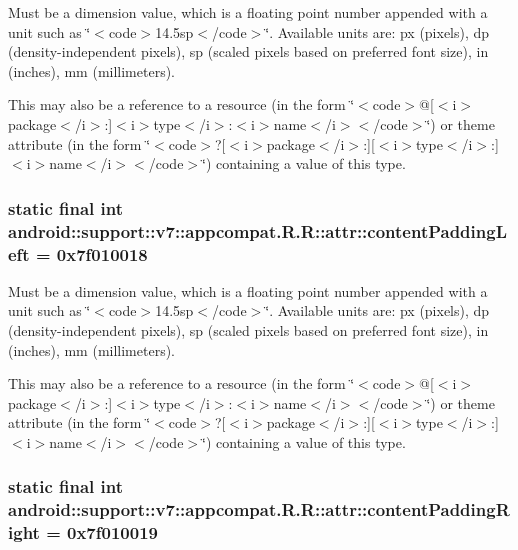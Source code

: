 Must be a dimension value, which is a floating point number appended with a unit such as \char`\"{}$<$code$>$14.5sp$<$/code$>$\char`\"{}. Available units are: px (pixels), dp (density-independent pixels), sp (scaled pixels based on preferred font size), in (inches), mm (millimeters). 

This may also be a reference to a resource (in the form \char`\"{}$<$code$>$@\mbox{[}$<$i$>$package$<$/i$>$:\mbox{]}$<$i$>$type$<$/i$>$:$<$i$>$name$<$/i$>$$<$/code$>$\char`\"{}) or theme attribute (in the form \char`\"{}$<$code$>$?\mbox{[}$<$i$>$package$<$/i$>$:\mbox{]}\mbox{[}$<$i$>$type$<$/i$>$:\mbox{]}$<$i$>$name$<$/i$>$$<$/code$>$\char`\"{}) containing a value of this type. \hypertarget{classandroid_1_1support_1_1v7_1_1appcompat_1_1_r_1_1attr_0a95570e618859c205ffbea644dd70d1}{
\subsubsection[{contentPaddingLeft}]{\setlength{\rightskip}{0pt plus 5cm}static final int android::support::v7::appcompat.R.R::attr::contentPaddingLeft = 0x7f010018}}
\label{classandroid_1_1support_1_1v7_1_1appcompat_1_1_r_1_1attr_0a95570e618859c205ffbea644dd70d1}


Must be a dimension value, which is a floating point number appended with a unit such as \char`\"{}$<$code$>$14.5sp$<$/code$>$\char`\"{}. Available units are: px (pixels), dp (density-independent pixels), sp (scaled pixels based on preferred font size), in (inches), mm (millimeters). 

This may also be a reference to a resource (in the form \char`\"{}$<$code$>$@\mbox{[}$<$i$>$package$<$/i$>$:\mbox{]}$<$i$>$type$<$/i$>$:$<$i$>$name$<$/i$>$$<$/code$>$\char`\"{}) or theme attribute (in the form \char`\"{}$<$code$>$?\mbox{[}$<$i$>$package$<$/i$>$:\mbox{]}\mbox{[}$<$i$>$type$<$/i$>$:\mbox{]}$<$i$>$name$<$/i$>$$<$/code$>$\char`\"{}) containing a value of this type. \hypertarget{classandroid_1_1support_1_1v7_1_1appcompat_1_1_r_1_1attr_47da2cc3b8ce02ee608e1f34dfc18f21}{
\subsubsection[{contentPaddingRight}]{\setlength{\rightskip}{0pt plus 5cm}static final int android::support::v7::appcompat.R.R::attr::contentPaddingRight = 0x7f010019}}
\label{classandroid_1_1support_1_1v7_1_1appcompat_1_1_r_1_1attr_47da2cc3b8ce02ee608e1f34dfc18f21}


